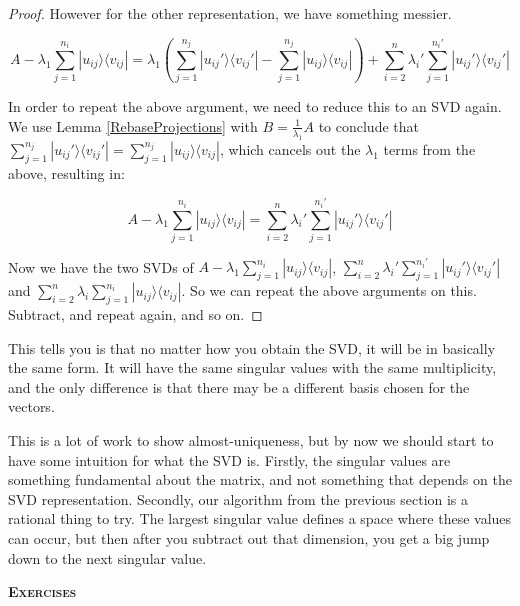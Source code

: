 \documentclass{amsbook}
\begin{document}
\begin{proof}
However for the other representation, we have something messier.

$$
A-\lambda_1\sum_{j=1}^{n_i}|u_{ij}\rangle\langle v_{ij}|=\lambda_1\left(\sum_{j=1}^{n_j}|u_{ij}'\rangle\langle v_{ij}'|-\sum_{j=1}^{n_j}|u_{ij}\rangle\langle v_{ij}|\right)+\sum_{i=2}^n\lambda_i'\sum_{j=1}^{n_i'}|u_{ij}'\rangle\langle v_{ij}'|
$$

In order to repeat the above argument, we need to reduce this to an SVD again.  We use Lemma \ref{RebaseProjections} with $B=\frac{1}{\lambda_1}A$ to conclude that $\sum_{j=1}^{n_j}|u_{ij}'\rangle\langle v_{ij}'|=\sum_{j=1}^{n_j}|u_{ij}\rangle\langle v_{ij}|$, which cancels out the $\lambda_1$ terms from the above, resulting in:

$$
A-\lambda_1\sum_{j=1}^{n_i}|u_{ij}\rangle\langle v_{ij}|=\sum_{i=2}^n\lambda_i'\sum_{j=1}^{n_i'}|u_{ij}'\rangle\langle v_{ij}'|
$$

Now we have the two SVDs of $A-\lambda_1\sum_{j=1}^{n_i}|u_{ij}\rangle\langle v_{ij}|$, $\sum_{i=2}^n\lambda_i'\sum_{j=1}^{n_i'}|u_{ij}'\rangle\langle v_{ij}'|$ and $\sum_{i=2}^n\lambda_i\sum_{j=1}^{n_i}|u_{ij}\rangle\langle v_{ij}|$.  So we can repeat the above arguments on this.  Subtract, and repeat again, and so on.

\end{proof}

This tells you is that no matter how you obtain the SVD, it will be in basically the same form.  It will have the same singular values with the same multiplicity, and the only difference is that there may be a different basis chosen for the vectors.

This is a lot of work to show almost-uniqueness, but by now we should start to have some intuition for what the SVD is.  Firstly, the singular values are something fundamental about the matrix, and not something that depends on the SVD representation.  Secondly, our algorithm from the previous section is a rational thing to try.  The largest singular value defines a space where these values can occur, but then after you subtract out that dimension, you get a big jump down to the next singular value.

{\bfseries\scshape\Large Exercises}
\end{document}
